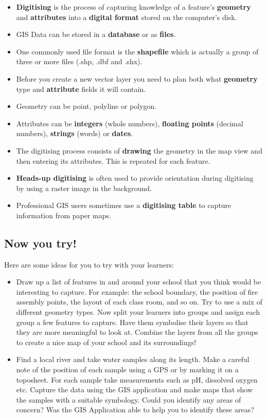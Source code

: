 \begin{itemize}
\item \textbf{Digitising} is the process of capturing knowledge of a
feature's \textbf{geometry} and \textbf{attributes} into a \textbf{digital
format} stored on the computer's disk.
\item GIS Data can be stored in a \textbf{database} or as \textbf{files}.
\item One commonly used file format is the \textbf{shapefile} which is
actually a group of three or more files (.shp, .dbf and .shx).
\item Before you create a new vector layer you need to plan both what
\textbf{geometry} type and \textbf{attribute} fields it will contain.
\item Geometry can be point, polyline or polygon.
\item Attributes can be \textbf{integers} (whole numbers), \textbf{floating
points} (decimal numbers), \textbf{strings} (words) or \textbf{dates}.
\item The digitising process consists of \textbf{drawing} the geometry in the
map view and then entering its attributes. This is repeated for each feature.
\item \textbf{Heads-up digitising} is often used to provide orientation
during digitising by using a raster image in the background.
\item Professional GIS users sometimes use a \textbf{digitising table} to
capture information from paper maps.
\end{itemize}

\subsection{Now you try!}

Here are some ideas for you to try with your learners:

\begin{itemize}
\item Draw up a list of features in and around your school that you think would be
interesting to capture. For example: the school boundary, the position of
fire assembly points, the layout of each class room, and so on. Try to use a
mix of different geometry types. Now split your learners into groups and
assign each group a few features to capture. Have them symbolise their layers
so that they are more meaningful to look at. Combine the layers from all the
groups to create a nice map of your school and its surroundings!
\item Find a local river and take water samples along its length. Make a careful
note of the position of each sample using a GPS or by marking it on a
toposheet. For each sample take measurements such as pH, dissolved oxygen
etc. Capture the data using the GIS application and make maps that show the
samples with a suitable symbology. Could you identify any areas of concern?
Was the GIS Application able to help you to identify these areas?
\end{itemize}

